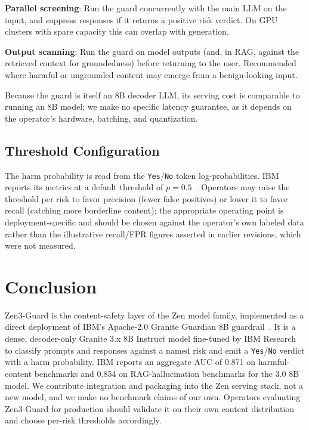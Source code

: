 \documentclass[11pt,a4paper]{article}
\begin{document}
\textbf{Parallel screening}: Run the guard concurrently with the main LLM on
the input, and suppress responses if it returns a positive risk verdict. On GPU clusters
with spare capacity this can overlap with generation.

\textbf{Output scanning}: Run the guard on model outputs (and, in RAG, against the
retrieved context for groundedness) before returning to the user. Recommended where
harmful or ungrounded content may emerge from a benign-looking input.

Because the guard is itself an 8B decoder LLM, its serving cost is comparable to running an
8B model; we make no specific latency guarantee, as it depends on the operator's hardware,
batching, and quantization.

\subsection{Threshold Configuration}

The harm probability is read from the \texttt{Yes}/\texttt{No} token log-probabilities.
IBM reports its metrics at a default threshold of $p = 0.5$~\cite{graniteguardian}.
Operators may raise the threshold per risk to favor precision (fewer false positives) or
lower it to favor recall (catching more borderline content); the appropriate operating
point is deployment-specific and should be chosen against the operator's own labeled data
rather than the illustrative recall/FPR figures asserted in earlier revisions, which were
not measured.

\section{Conclusion}
\label{sec:conclusion}

Zen3-Guard is the content-safety layer of the Zen model family, implemented as a direct
deployment of IBM's Apache-2.0 Granite Guardian 8B guardrail~\cite{graniteguardian}. It is
a dense, decoder-only Granite 3.x 8B Instruct model fine-tuned by IBM Research to classify
prompts and responses against a named risk and emit a \texttt{Yes}/\texttt{No} verdict with
a harm probability. IBM reports an aggregate AUC of 0.871 on harmful-content benchmarks and
0.854 on RAG-hallucination benchmarks for the 3.0 8B model. We contribute integration and
packaging into the Zen serving stack, not a new model, and we make no benchmark claims of
our own. Operators evaluating Zen3-Guard for production should validate it on their own
content distribution and choose per-risk thresholds accordingly.
\end{document}
